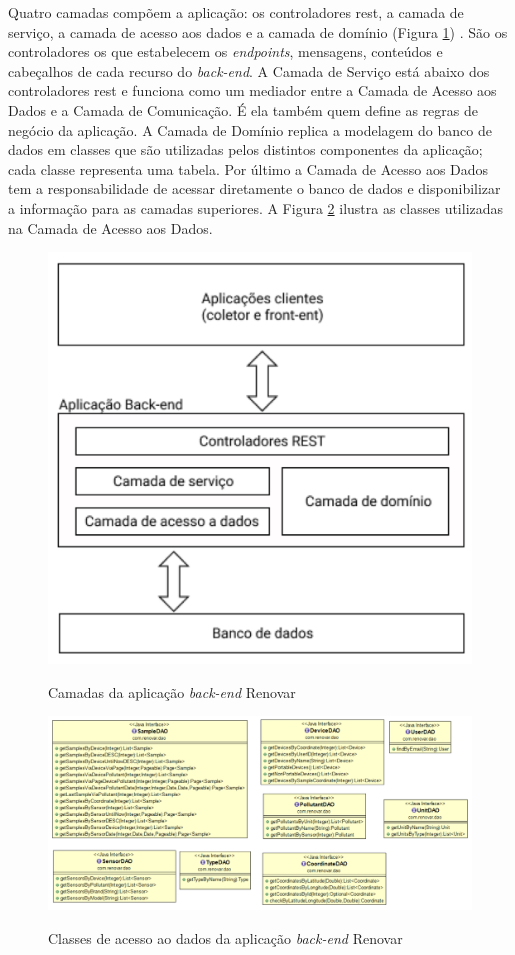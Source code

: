 Quatro camadas compõem a aplicação: os controladores \acrshort{rest}, a camada de serviço, a camada de acesso aos dados e a camada de domínio (Figura \ref{fig:renovar-backend}) \cite{Teixeira2018}. São os controladores os que estabelecem os \textit{endpoints}, mensagens, conteúdos e cabeçalhos de cada recurso do \textit{back-end}. A Camada de Serviço está abaixo dos controladores \acrshort{rest} e funciona como um mediador entre a Camada de Acesso aos Dados e a Camada de Comunicação. É ela também quem define as regras de negócio da aplicação. A Camada de Domínio replica a modelagem do banco de dados em classes que são utilizadas pelos distintos componentes da aplicação; cada classe representa uma tabela. Por último a Camada de Acesso aos Dados tem a responsabilidade de acessar diretamente o banco de dados e disponibilizar a informação para as camadas superiores. A Figura \ref{fig:renovar-backend-dao} ilustra as classes utilizadas na Camada de Acesso aos Dados.

\begin{figure}[h]
    \centering
    \caption{Camadas da aplicação \textit{back-end} Renovar}
    \includegraphics[width=0.80\linewidth]{chapters//2-CLEAN/Figuras/Renovar back-end strcuture.png}
    \label{fig:renovar-backend}
\end{figure}

\begin{figure}[h]
    \centering
    \caption{Classes de acesso ao dados da aplicação \textit{back-end} Renovar}
    \includegraphics[width=0.80\linewidth]{chapters//2-CLEAN/Figuras/Classes de acesso aos Dados.png}
    \label{fig:renovar-backend-dao}
\end{figure}

